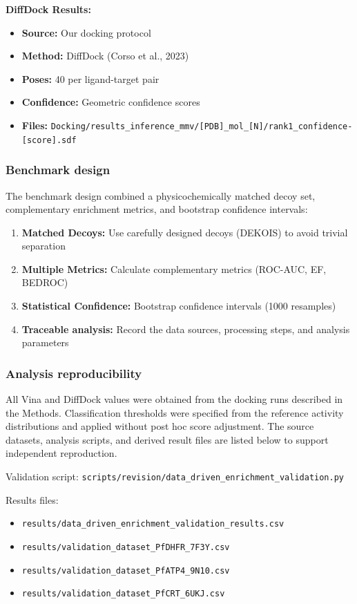 \documentclass[journal=jcisd8,manuscript=suppinfo]{achemso}
\begin{document}
\textbf{DiffDock Results:}
\begin{itemize}
  \item \textbf{Source:} Our docking protocol
  \item \textbf{Method:} DiffDock (Corso et al., 2023)
  \item \textbf{Poses:} \num{40} per ligand-target pair
  \item \textbf{Confidence:} Geometric confidence scores
  \item \textbf{Files:} \texttt{Docking/results\_inference\_mmv/[PDB]\_mol\_[N]/rank1\_confidence-[score].sdf}
\end{itemize}

\subsubsection*{Benchmark design}

The benchmark design combined a physicochemically matched decoy set, complementary enrichment metrics, and bootstrap confidence intervals:

\begin{enumerate}
  \item \textbf{Matched Decoys:} Use carefully designed decoys (DEKOIS) to avoid trivial separation
  \item \textbf{Multiple Metrics:} Calculate complementary metrics (ROC-AUC, EF, BEDROC)
  \item \textbf{Statistical Confidence:} Bootstrap confidence intervals (\num{1000} resamples)
  \item \textbf{Traceable analysis:} Record the data sources, processing steps, and analysis parameters
\end{enumerate}

\subsubsection*{Analysis reproducibility}

All Vina and DiffDock values were obtained from the docking runs described in the Methods. Classification thresholds were specified from the reference activity distributions and applied without post hoc score adjustment. The source datasets, analysis scripts, and derived result files are listed below to support independent reproduction.

Validation script: \texttt{scripts/revision/data\_driven\_enrichment\_validation.py}

Results files:
\begin{itemize}
  \item \texttt{results/data\_driven\_enrichment\_validation\_results.csv}
  \item \texttt{results/validation\_dataset\_PfDHFR\_7F3Y.csv}
  \item \texttt{results/validation\_dataset\_PfATP4\_9N10.csv}
  \item \texttt{results/validation\_dataset\_PfCRT\_6UKJ.csv}
  \end{itemize}
\end{document}
